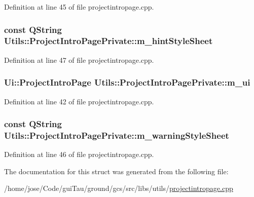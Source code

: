 Definition at line 45 of file projectintropage.\-cpp.

\hypertarget{struct_utils_1_1_project_intro_page_private_a0bff93c252b31403685c055919bd6256}{
\subsubsection[{m\-\_\-hint\-Style\-Sheet}]{\setlength{\rightskip}{0pt plus 5cm}const {\bf Q\-String} Utils\-::\-Project\-Intro\-Page\-Private\-::m\-\_\-hint\-Style\-Sheet}}\label{struct_utils_1_1_project_intro_page_private_a0bff93c252b31403685c055919bd6256}


Definition at line 47 of file projectintropage.\-cpp.

\hypertarget{struct_utils_1_1_project_intro_page_private_a8b58b2c9069e4ea0e1dbf49d0588f17e}{
\subsubsection[{m\-\_\-ui}]{\setlength{\rightskip}{0pt plus 5cm}Ui\-::\-Project\-Intro\-Page Utils\-::\-Project\-Intro\-Page\-Private\-::m\-\_\-ui}}\label{struct_utils_1_1_project_intro_page_private_a8b58b2c9069e4ea0e1dbf49d0588f17e}


Definition at line 42 of file projectintropage.\-cpp.

\hypertarget{struct_utils_1_1_project_intro_page_private_a6b536310e9c0d07f8eb1ac3f84f8d9b0}{
\subsubsection[{m\-\_\-warning\-Style\-Sheet}]{\setlength{\rightskip}{0pt plus 5cm}const {\bf Q\-String} Utils\-::\-Project\-Intro\-Page\-Private\-::m\-\_\-warning\-Style\-Sheet}}\label{struct_utils_1_1_project_intro_page_private_a6b536310e9c0d07f8eb1ac3f84f8d9b0}


Definition at line 46 of file projectintropage.\-cpp.



The documentation for this struct was generated from the following file\-:\begin{DoxyCompactItemize}
\item 
/home/jose/\-Code/gui\-Tau/ground/gcs/src/libs/utils/\hyperlink{projectintropage_8cpp}{projectintropage.\-cpp}\end{DoxyCompactItemize}
